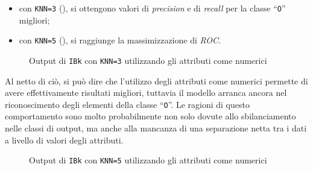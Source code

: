 \begin{itemize}
  \item con \texttt{KNN=3} (), si ottengono valori di \emph{precision} e di \emph{recall} per la classe ``\texttt{O}'' migliori;
  \item con \texttt{KNN=5} (), si raggiunge la massimizzazione di \emph{ROC}.
\end{itemize}


\begin{figure}[H]
  \centering
  \caption{Output di \texttt{IBk} con \texttt{KNN=3} utilizzando gli attributi come numerici}%
  \label{fig:ibk:3-num}
\end{figure}

Al netto di ciò, si può dire che l'utilizzo degli attributi come numerici permette di avere effettivamente risultati migliori,
tuttavia il modello arranca ancora nel riconoscimento degli elementi della classe ``\texttt{O}''.
Le ragioni di questo comportamento sono molto probabilmente non solo dovute allo sbilanciamento nelle classi di output,
ma anche alla mancanza di una separazione netta tra i dati a livello di valori degli attributi.

\begin{figure}[H]
  \centering
  \caption{Output di \texttt{IBk} con \texttt{KNN=5} utilizzando gli attributi come numerici}%
  \label{fig:ibk:5-num}
\end{figure}


